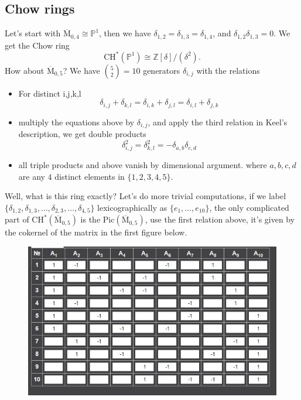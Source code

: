 \documentclass[../main.tex]{subfiles}
\begin{document}
\subsection{Chow rings}
\begin{example}
Let's start with $\overline{\mathrm{M}}_{0,4}\cong \mathbb{P}^{1}$, then we have $\delta_{1,2}=\delta_{1,3}=\delta_{1,4}$, and $\delta_{1,2}\delta_{1,3}=0$. We get the Chow ring 
$$\mathrm{CH}^{*}(\mathbb{P}^{1})\cong \mathbb{Z}[\delta]/(\delta^{2}).$$
How about $\overline{\mathrm{M}}_{0,5}$? We have $\binom{5}{2}=10$ generators $\delta_{i,j}$ with the relations
\begin{itemize}
\item For distinct i,j,k,l
$$\delta_{i,j}+\delta_{k,l}=\delta_{i,k}+\delta_{j,l}=\delta_{i,l}+\delta_{j,k}$$
\item multiply the equations above by $\delta_{i,j}$, and apply the third relation in Keel's description, we get double products 
$$\delta_{i,j}^{2}=\delta_{k,l}^{2}=-\delta_{a,b}\delta_{c,d}$$
\item all triple products and above vanish by dimensional argument.
where $a,b,c,d$ are any $4$ distinct elements in $\{1,2,3,4,5\}$.
\end{itemize}
Well, what is this ring exactly? Let's do more trivial computations, if we label $\{\delta_{1,2},\delta_{1,3},\dots ,\delta_{2,3},\dots , \delta_{4,5}\}$ lexicographically as $\{e_{1},\dots, e_{10}\}$, the only complicated part of $\mathrm{CH}^{*}(\overline{\mathrm{M}}_{0,5})$ is the $\mathrm{Pic}(\overline{\mathrm{M}}_{0,5})$, use the first relation above, it's given by the cokernel of the matrix in the first figure below.
\begin{figure}[h!]
\centering
\includegraphics[width=\textwidth]{img/matrix.JPG}

\end{figure}
\end{example}
\end{document}
